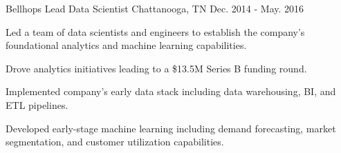 \begin{cventries}
  \cventry
    {Bellhops} %
    {Lead Data Scientist} %
    {Chattanooga, TN} %
    {Dec. 2014 - May. 2016} %
    {
      \begin{cvitems} %
        \item {Led a team of data scientists and engineers to establish the company's foundational analytics and machine learning capabilities.}
        \item {Drove analytics initiatives leading to a \$13.5M Series B funding round.}
        \item {Implemented company's early data stack including data warehousing, BI, and ETL pipelines.}
        \item {Developed early-stage machine learning including demand forecasting, market segmentation, and customer utilization capabilities.}
      \end{cvitems}
    }




\end{cventries}
